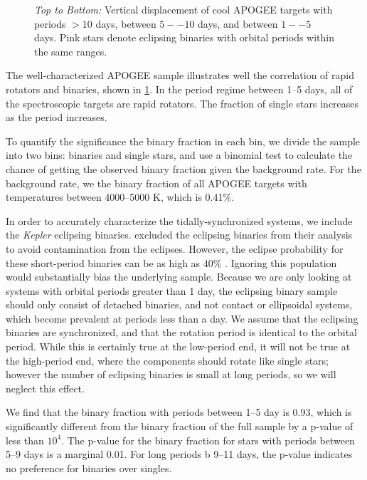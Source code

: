 \documentclass[manuscript]{aastex6}
\newcommand{\Kepler}{\mbox{\textit{Kepler}}}
\begin{document}
\begin{figure}[htb]
    \centering
    \caption{\emph{Top to Bottom:} Vertical displacement of cool APOGEE targets
        with \citet{McQuillan14} periods \(> 10\) days, between \(5--10\) days, 
        and between \(1--5\) days. Pink stars denote eclipsing binaries with
    orbital periods within the same ranges.}\label{fig:apogee_rapid_excess}
\end{figure}

The well-characterized APOGEE sample illustrates well the
correlation of rapid rotators and binaries, shown in
\cref{fig:apogee_rapid_excess}. In the period regime between 1--5 days, all of the
spectroscopic targets are rapid rotators. The fraction of single stars
increases as the period increases.

To quantify the significance the binary fraction in each bin, we divide the
sample into two bins: binaries and single stars, and use a binomial test to
calculate the chance of getting the observed binary fraction given the
background rate. For the background rate, we the binary fraction of all APOGEE 
targets with temperatures between 4000--5000 K, which is 0.41\%. 

In order to accurately characterize the tidally-synchronized systems, we
include the \Kepler{} eclipsing binaries. \citep{McQuillan14} excluded the
eclipsing binaries from their analysis to avoid contamination from the
eclipses. However, the eclipse probability for these short-period binaries can
be as high as 40\% \citep{Kirk16}. Ignoring this population would substantially
bias the underlying sample. Because we are only looking at systems with orbital
periods greater than 1 day, the eclipsing binary sample should only consist of
detached binaries, and not contact or ellipsoidal systems, which become
prevalent at periods less than a day. We assume that the eclipsing binaries are
synchronized, and that the rotation period is identical to the orbital period.
While this is certainly true at the low-period end, it will not be true at the
high-period end, where the components should rotate like single stars; 
however the number of eclipsing binaries is small at long periods, so we will
neglect this effect.

We find that the binary fraction with periods between 1--5 day is 0.93, which
is significantly different from the binary fraction of the full sample by a
p-value of less than \(10^4\). The p-value for the binary fraction for stars
with periods between 5--9 days is a marginal 0.01. For long periods b
9--11 days, the p-value indicates no preference for binaries over singles.
\end{document}
